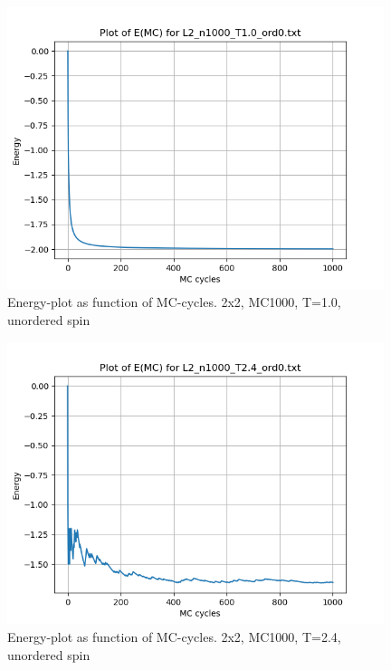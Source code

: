 \documentclass{article}
\begin{document}
\begin{figure}[ht]
    \centering
    \includegraphics[width = 11cm]{img/energy_L2_n1000_T10_ord0.png}
    \caption{Energy-plot as function of MC-cycles. 2x2, MC1000, T=1.0, unordered spin}
    \label{fig:energy_L2_n1000_T1.0_ord0}
  \end{figure}

\begin{figure}[ht]
    \centering
    \includegraphics[width = 11cm]{img/energy_L2_n1000_T24_ord0.png}
    \caption{Energy-plot as function of MC-cycles. 2x2, MC1000, T=2.4, unordered spin}
    \label{fig:energy_L2_n1000_T2.4_ord0}
  \end{figure}
\end{document}
